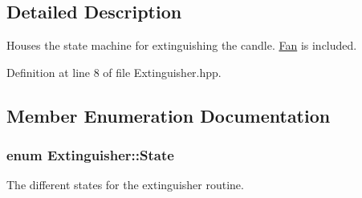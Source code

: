 \subsection{Detailed Description}
Houses the state machine for extinguishing the candle. \hyperlink{classFan}{Fan} is included. 

Definition at line 8 of file Extinguisher.\-hpp.



\subsection{Member Enumeration Documentation}
\hypertarget{classExtinguisher_a969a7cce3382fc5d67f687540896e3ab}{
\subsubsection[{State}]{\setlength{\rightskip}{0pt plus 5cm}enum {\bf Extinguisher\-::\-State}\hspace{0.3cm}{\ttfamily [private]}}}\label{classExtinguisher_a969a7cce3382fc5d67f687540896e3ab}


The different states for the extinguisher routine. 

